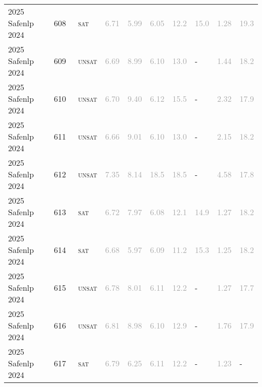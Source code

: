 \begin{center}
{\begin{longtable}{@{}llllllllll@{}}
2025 Safenlp 2024 & 608 & ~\textsc{sat} & \textcolor{darkgray}{6.71} & \textcolor{darkgray}{5.99} & \textcolor{darkgray}{6.05} & \textcolor{darkgray}{12.2} & \textcolor{darkgray}{15.0} & \textcolor{darkgray}{1.28} & \textcolor{darkgray}{19.3} \\
2025 Safenlp 2024 & 609 & ~\textsc{unsat} & \textcolor{darkgray}{6.69} & \textcolor{darkgray}{8.99} & \textcolor{darkgray}{6.10} & \textcolor{darkgray}{13.0} & - & \textcolor{darkgray}{1.44} & \textcolor{darkgray}{18.2} \\
2025 Safenlp 2024 & 610 & ~\textsc{unsat} & \textcolor{darkgray}{6.70} & \textcolor{darkgray}{9.40} & \textcolor{darkgray}{6.12} & \textcolor{darkgray}{15.5} & - & \textcolor{darkgray}{2.32} & \textcolor{darkgray}{17.9} \\
2025 Safenlp 2024 & 611 & ~\textsc{unsat} & \textcolor{darkgray}{6.66} & \textcolor{darkgray}{9.01} & \textcolor{darkgray}{6.10} & \textcolor{darkgray}{13.0} & - & \textcolor{darkgray}{2.15} & \textcolor{darkgray}{18.2} \\
2025 Safenlp 2024 & 612 & ~\textsc{unsat} & \textcolor{darkgray}{7.35} & \textcolor{darkgray}{8.14} & \textcolor{darkgray}{18.5} & \textcolor{darkgray}{18.5} & - & \textcolor{darkgray}{4.58} & \textcolor{darkgray}{17.8} \\
2025 Safenlp 2024 & 613 & ~\textsc{sat} & \textcolor{darkgray}{6.72} & \textcolor{darkgray}{7.97} & \textcolor{darkgray}{6.08} & \textcolor{darkgray}{12.1} & \textcolor{darkgray}{14.9} & \textcolor{darkgray}{1.27} & \textcolor{darkgray}{18.2} \\
2025 Safenlp 2024 & 614 & ~\textsc{sat} & \textcolor{darkgray}{6.68} & \textcolor{darkgray}{5.97} & \textcolor{darkgray}{6.09} & \textcolor{darkgray}{11.2} & \textcolor{darkgray}{15.3} & \textcolor{darkgray}{1.25} & \textcolor{darkgray}{18.2} \\
2025 Safenlp 2024 & 615 & ~\textsc{unsat} & \textcolor{darkgray}{6.78} & \textcolor{darkgray}{8.01} & \textcolor{darkgray}{6.11} & \textcolor{darkgray}{12.2} & - & \textcolor{darkgray}{1.27} & \textcolor{darkgray}{17.7} \\
2025 Safenlp 2024 & 616 & ~\textsc{unsat} & \textcolor{darkgray}{6.81} & \textcolor{darkgray}{8.98} & \textcolor{darkgray}{6.10} & \textcolor{darkgray}{12.9} & - & \textcolor{darkgray}{1.76} & \textcolor{darkgray}{17.9} \\
2025 Safenlp 2024 & 617 & ~\textsc{sat} & \textcolor{darkgray}{6.79} & \textcolor{darkgray}{6.25} & \textcolor{darkgray}{6.11} & \textcolor{darkgray}{12.2} & - & \textcolor{darkgray}{1.23} & - \\

\end{longtable}}
\end{center}
